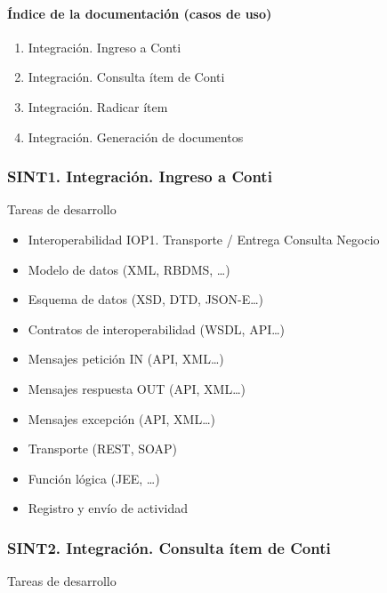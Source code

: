 \documentclass[
  paper=a4,
  ,captions=tableheading
]{scrartcl}
\providecommand{\tightlist}{%
  \setlength{\itemsep}{0pt}\setlength{\parskip}{0pt}}
\begin{document}
\paragraph{Índice de la documentación (casos de
uso)}\label{sec:uxedndice-de-la-documentaciuxf3n-casos-de-uso-3}

\begin{enumerate}
\def\labelenumi{\arabic{enumi}.}
\tightlist
\item
  Integración. Ingreso a Conti
\item
  Integración. Consulta ítem de Conti
\item
  Integración. Radicar ítem
\item
  Integración. Generación de documentos
\end{enumerate}

\subsubsection{SINT1. Integración. Ingreso a
Conti}\label{sec:sint1.-integraciuxf3n.-ingreso-a-conti-1}

Tareas de desarrollo

\begin{itemize}
\tightlist
\item
  Interoperabilidad IOP1. Transporte / Entrega Consulta Negocio
\item
  Modelo de datos (XML, RBDMS, \ldots)
\item
  Esquema de datos (XSD, DTD, JSON-E\ldots)
\item
  Contratos de interoperabilidad (WSDL, API\ldots)
\item
  Mensajes petición IN (API, XML\ldots)
\item
  Mensajes respuesta OUT (API, XML\ldots)
\item
  Mensajes excepción (API, XML\ldots)
\item
  Transporte (REST, SOAP)
\item
  Función lógica (JEE, \ldots)
\item
  Registro y envío de actividad
\end{itemize}

\subsubsection{SINT2. Integración. Consulta ítem de
Conti}\label{sec:sint2.-integraciuxf3n.-consulta-uxedtem-de-conti-1}

Tareas de desarrollo
\end{document}
